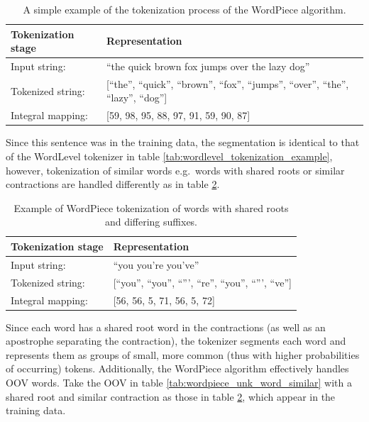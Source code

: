 \documentclass[12pt]{article}
\begin{document}
\begin{table}[h!]
    \centering
    \begin{tabular}{l l}
        \toprule
        Tokenization stage & Representation                                                                            \\
        \midrule
        Input string:      & ``the quick brown fox jumps over the lazy dog''                                           \\
        Tokenized string:  & [``the'', ``quick'', ``brown'', ``fox'', ``jumps'', ``over'', ``the'', ``lazy'', ``dog''] \\
        Integral mapping:  & [59, 98, 95, 88, 97, 91, 59, 90, 87]                                                      \\
        \bottomrule
    \end{tabular}
    \caption{A simple example of the tokenization process of the WordPiece algorithm.}
    \label{tab:wordpiece_tokenization_example}
\end{table}

\noindent
Since this sentence was in the training data, the segmentation is identical to that of the WordLevel tokenizer in table
\ref{tab:wordlevel_tokenization_example}, however, tokenization of similar words e.g.~words with shared roots or similar contractions are handled
differently as in table \ref{tab:wordpiece_tokenization_shared_roots_example}.

\begin{table}[h!]
    \centering
    \begin{tabular}{l l}
        \toprule
        Tokenization stage & Representation                                            \\
        \midrule
        Input string:      & ``you you're you've''                                     \\
        Tokenized string:  & [``you'', ``you'', ``''', ``re'', ``you'', ``''', ``ve''] \\
        Integral mapping:  & [56, 56, 5, 71, 56, 5, 72]                                \\
        \bottomrule
    \end{tabular}
    \caption{Example of WordPiece tokenization of words with shared roots and differing suffixes.}
    \label{tab:wordpiece_tokenization_shared_roots_example}
\end{table}

\noindent
Since each word has a shared root word in the contractions (as well as an apostrophe separating the contraction), the tokenizer segments each word and
represents them as groups of small, more common (thus with higher probabilities of occurring) tokens. Additionally, the WordPiece algorithm
effectively handles OOV words. Take the OOV in table \ref{tab:wordpiece_unk_word_similar} with a shared root and similar contraction as those in table
\ref{tab:wordpiece_tokenization_shared_roots_example}, which appear in the training data.
\end{document}
